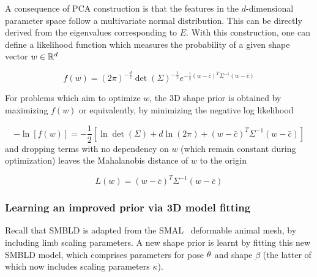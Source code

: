 

A consequence of PCA construction is that the features in the $d$-dimensional parameter space follow a multivariate normal distribution. This can be directly derived from the eigenvalues corresponding to $E$. %
With this construction, one can define a likelihood function which measures the probability of a given shape vector $w \in {\mathbb{R}^{d}}$

\begin{equation}
    f(w) = (2\pi)^{-\frac{d}{2}}\det(\Sigma)^{-\frac{1}{2}}e^{-\frac{1}{2}(w-\bar{c})^T\Sigma^{-1}(w-\bar{c})}
\end{equation}

For problems which aim to optimize $w$, the 3D shape prior is obtained by maximizing $f(w)$ or equivalently, by minimizing the negative log likelihood

\begin{equation}
     -\ln\left[f(w)\right] = -\frac{1}{2}\left[\ln\det(\Sigma) + d\ln(2\pi) +  (w - \bar{c})^T\Sigma^{-1}(w-\bar{c})\right]
\end{equation}
and dropping terms with no dependency on $w$ (which remain constant during optimization) leaves the Mahalanobis distance of $w$ to the origin

\begin{equation}
    L(w) = (w - \bar{c})^T\Sigma^{-1}(w-\bar{c})
\end{equation}



\subsubsection{Learning an improved prior via 3D model fitting}

Recall that SMBLD is adapted from the SMAL~\cite{zuffi2017menagerie} deformable animal mesh, by including limb scaling parameters. A new shape prior is learnt by fitting this new SMBLD model, which comprises parameters for pose $\theta$ and shape $\beta$ (the latter of which now includes scaling parameters $\kappa$).

